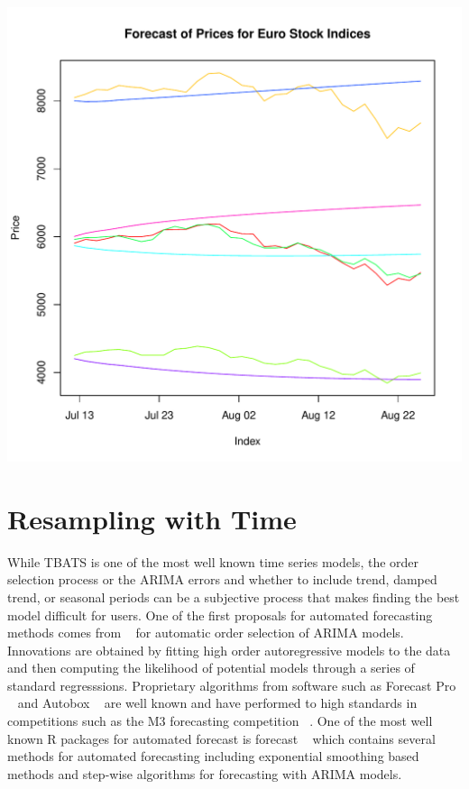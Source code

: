 \documentclass{article}\usepackage[]{graphicx}\usepackage[]{color}
\makeatletter
\def\maxwidth{ %
  \ifdim\Gin@nat@width>\linewidth
    \linewidth
  \else
    \Gin@nat@width
  \fi
}
\newenvironment{knitrout}{}{} %
\theoremstyle{definition}
\let\proglang=\textsf
\newcommand{\pkg}[1]{{\fontseries{b}\selectfont #1}}
\makeatother
\begin{document}
\begin{knitrout}
\color{fgcolor}
\includegraphics[width=\maxwidth]{figure/bigVarplot-1} 

\end{knitrout}

\section{Resampling with Time}

While TBATS is one of the most well known time series models, the order selection process or the ARIMA errors and whether to include trend, damped trend, or seasonal periods can be a subjective process that makes finding the best model difficult for users. One of the first proposals for automated forecasting methods comes from ~\cite{hannanOrder} for automatic order selection of ARIMA models. Innovations are obtained by fitting high order autoregressive models to the data and then computing the likelihood of potential models through a series of standard regresssions. Proprietary algorithms from software such as \proglang{Forecast Pro} ~\cite{forecastpro} and \proglang{Autobox} ~\cite{reillyautobox} are well known and have performed to high standards in competitions such as the M3 forecasting competition ~\cite{Makridakis2000451}. One of the most well known R packages for automated forecast is \pkg{forecast} ~\cite{HyndForecast} which contains several methods for automated forecasting including exponential smoothing based methods and step-wise algorithms for forecasting with ARIMA models.
\end{document}
